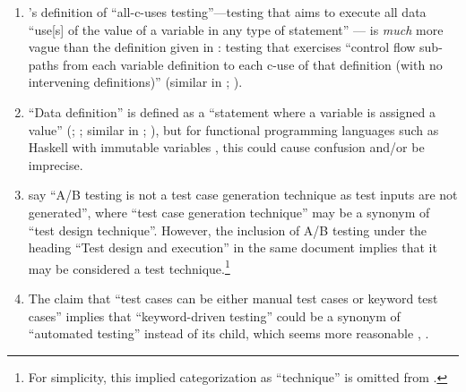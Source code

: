 \begin{enumerate}
    \item %
          \citeauthor{IEEE2017}'s definition of ``all-\acsp{c-use} testing''---testing
          that aims to execute all data ``use[s] of the value of a variable in
          any type of statement'' \citeyearpar[p.~83]{IEEE2017}---%
          is \emph{much} more vague than the definition given in
          \citeyearpar[p.~27]{IEEE2021}: testing that exercises ``control flow
          sub-paths from each variable definition to each \acs{c-use} of that
          definition (with no intervening definitions)'' (similar in
          \citealp[p.~425]{vanVliet2000}; \citealp[p.~479]{PetersAndPedrycz2000}).
    \item %
          ``Data definition'' is defined as a ``statement where a variable is
          assigned a value'' (\citealp[p.~3]{IEEE2021}; \citeyear[p.~115]{IEEE2017}%
          ; similar in \citeyear[p.~27]{IEEE2012};
          \citealp[p.~424]{vanVliet2000}), but for functional programming
          languages such as Haskell with immutable variables
          \citep{WikiHaskell2023}, this could cause confusion and/or be
          imprecise.
    \item %
           \citet[p.~36]{IEEE2022} say ``A/B testing is not a test
          case generation technique as test inputs are not generated'', where
          ``test case generation technique'' may be a synonym of ``test design
          technique''. However, the inclusion of A/B testing under the heading
          ``Test design and execution'' in the same document implies that it
          may be considered a test technique.\footnote{For simplicity, this
              implied categorization as ``technique'' is omitted from
              .}
    \item %
          The claim that ``test cases can be either manual test cases or
          keyword test cases'' \citep[p.~6]{IEEE2016} implies that ``keyword-driven
          testing'' could be a synonym of ``automated testing'' instead of its
          child, which seems more reasonable \ifnotpaper
              \citetext{\citeyear[p.~4]{IEEE2016}; \citeyear[p.~35]{IEEE2022}}%
          \else\cite[p.~35]{IEEE2022}, \cite[p.~4]{IEEE2016}\fi.


\end{enumerate}
